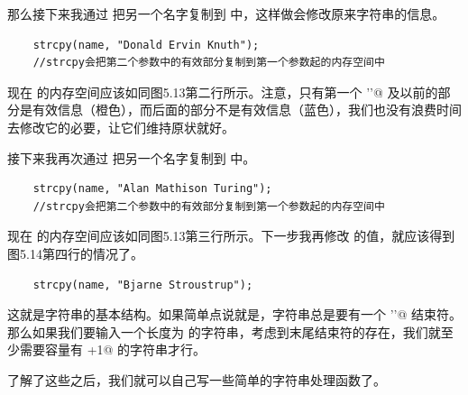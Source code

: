 那么接下来我通过 \lstinline@strcpy@ 把另一个名字复制到 \lstinline@name@ 中，这样做会修改原来字符串的信息。
\begin{lstlisting}
    strcpy(name, "Donald Ervin Knuth");
    //strcpy会把第二个参数中的有效部分复制到第一个参数起的内存空间中
\end{lstlisting}
现在 \lstinline@name@ 的内存空间应该如同图5.13第二行所示。注意，只有第一个 \lstinline@'\0'@ 及以前的部分是有效信息（橙色），而后面的部分不是有效信息（蓝色），我们也没有浪费时间去修改它的必要，让它们维持原状就好。\par
接下来我再次通过 \lstinline@strcpy@ 把另一个名字复制到 \lstinline@name@ 中。
\begin{lstlisting}
    strcpy(name, "Alan Mathison Turing");
    //strcpy会把第二个参数中的有效部分复制到第一个参数起的内存空间中
\end{lstlisting}
现在 \lstinline@name@ 的内存空间应该如同图5.13第三行所示。下一步我再修改 \lstinline@name@ 的值，就应该得到图5.14第四行的情况了。
\begin{lstlisting}
    strcpy(name, "Bjarne Stroustrup");
\end{lstlisting}\par
这就是字符串的基本结构。如果简单点说就是，字符串总是要有一个 \lstinline@'\0'@ 结束符。那么如果我们要输入一个长度为 \lstinline@n@ 的字符串，考虑到末尾结束符的存在，我们就至少需要容量有 \lstinline@n+1@ 的字符串才行。\par
了解了这些之后，我们就可以自己写一些简单的字符串处理函数了。\par
